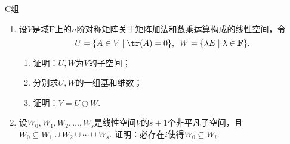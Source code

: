 \centerline{\heiti C组}
\begin{enumerate}
    \item 设$V$是域$\mathbf{F}$上的$n$阶对称矩阵关于矩阵加法和数乘运算构成的线性空间，令
          \[U=\{A\in V \mid \tr(A)=0\},\enspace W=\{\lambda E \mid \lambda\in\mathbf{F}\}.\]
          \begin{enumerate}
              \item 证明：$U,W$为$V$的子空间；

              \item 分别求$U,W$的一组基和维数；

              \item 证明：$V=U\oplus W$.
          \end{enumerate}

    \item 设$W_0,W_1,W_2,\ldots,W_s$是线性空间$V$的$s+1$个非平凡子空间，且$W_0 \subseteq W_1 \cup W_2 \cup \cdots \cup W_s$. 证明：必存在$i$使得$W_0\subseteq W_i$.
\end{enumerate}
